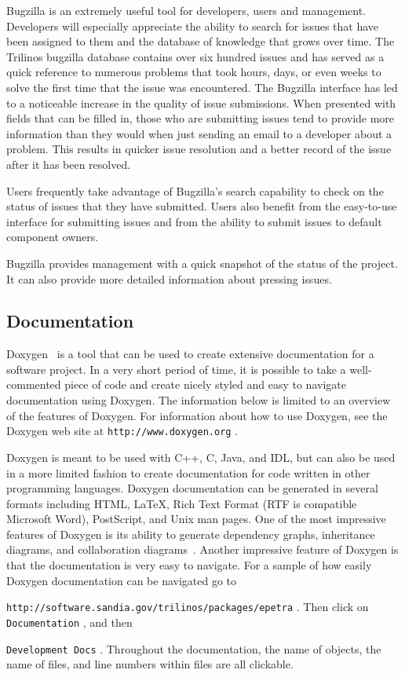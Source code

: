 \documentclass[12pt,relax]{article}
\newcommand{\InlineDirectory}[1]{
  {\hspace{0.01 in}} {\tt #1} {\hspace{0.01 in}}}
\begin{document}

Bugzilla is an extremely useful tool for developers, users and management.  
Developers will especially appreciate the ability to search for issues 
that have been assigned to them and the database of knowledge that grows over
time.  The Trilinos bugzilla database contains over six hundred issues and 
has served as a quick reference to numerous problems that took hours, days, 
or even weeks to solve the first time that the issue was encountered.  The 
Bugzilla interface has led to a noticeable increase in the quality of 
issue submissions.  When presented with fields that can be filled in, those 
who are 
submitting issues tend to provide more information than they would when just 
sending an email to a developer about a problem.  This results in quicker 
issue resolution and a better record of the issue after it has been resolved.  

Users frequently take advantage of Bugzilla's search capability to check on 
the status of issues that they have submitted.  Users also benefit from the 
easy-to-use interface for submitting issues and from the ability to submit 
issues to default component owners.  

Bugzilla provides management with a quick snapshot of the status of the 
project.  It can also provide more detailed information about pressing issues.

\subsection{Documentation}

Doxygen~\cite{Doxygen} is a tool that can be used to create 
extensive documentation for a software project.  In a very short period of 
time, it is possible to take a well-commented piece 
of code and create nicely styled and easy to navigate documentation using 
Doxygen.  The information below is limited 
to an overview of the features of Doxygen.  For information about how to use 
Doxygen, see the Doxygen 
web site at \InlineDirectory{http://www.doxygen.org}.  

Doxygen is meant to be used with C++, C, Java, and IDL, but can also be used 
in a more limited fashion to create documentation for code written in other
programming languages.  Doxygen documentation 
can be generated in several formats including HTML, \LaTeX, Rich Text Format 
(RTF is compatible Microsoft Word), PostScript, and
Unix man pages.  One of the most impressive features of Doxygen is its ability 
to generate dependency graphs, inheritance diagrams, and collaboration 
diagrams~\cite{Doxygen}.  Another impressive feature of Doxygen is that the 
documentation is very easy to navigate.  For a sample of how easily Doxygen 
documentation can be navigated go to
\newline
\InlineDirectory{http://software.sandia.gov/trilinos/packages/epetra}.  Then
click on \InlineDirectory{Documentation}, and then 
\InlineDirectory{Development Docs}. 
Throughout the documentation, the name of objects, 
the name of files, and line numbers within files are all clickable.
\end{document}
